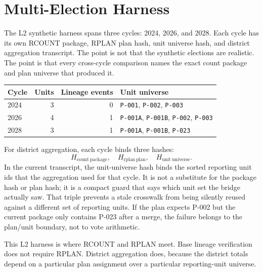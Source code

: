 \section{Multi-Election Harness}

The L2 synthetic harness spans three cycles: 2024, 2026, and 2028. Each cycle
has its own RCOUNT package, RPLAN plan hash, unit universe hash, and district
aggregation transcript. The point is not that the synthetic elections are
realistic. The point is that every cross-cycle comparison names the exact count
package and plan universe that produced it.

\begin{center}
\small
\begin{tabularx}{\textwidth}{lrrX}
\toprule
Cycle & Units & Lineage events & Unit universe \\
\midrule
2024 & 3 & 0 & \texttt{P-001}, \texttt{P-002}, \texttt{P-003} \\
2026 & 4 & 1 & \texttt{P-001A}, \texttt{P-001B}, \texttt{P-002}, \texttt{P-003} \\
2028 & 3 & 1 & \texttt{P-001A}, \texttt{P-001B}, \texttt{P-023} \\
\bottomrule
\end{tabularx}
\end{center}

For district aggregation, each cycle binds three hashes:
\[
  H_{\mathrm{count\ package}},\quad
  H_{\mathrm{rplan\ plan}},\quad
  H_{\mathrm{unit\ universe}}.
\]
In the current transcript, the unit-universe hash binds the sorted reporting
unit ids that the aggregation used for that cycle. It is not a substitute for
the package hash or plan hash; it is a compact guard that says which unit set
the bridge actually saw.
That triple prevents a stale crosswalk from being silently reused against a
different set of reporting units. If the plan expects P-002 but the current
package only contains P-023 after a merge, the failure belongs to the plan/unit
boundary, not to vote arithmetic.

This L2 harness is where RCOUNT and RPLAN meet. Base lineage verification does
not require RPLAN. District aggregation does, because the district totals depend
on a particular plan assignment over a particular reporting-unit universe.
